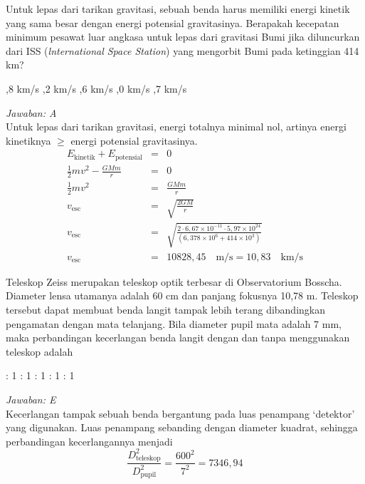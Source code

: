 \documentclass[11pt,fleqn, a4paper]{exam}
\begin{document}
\begin{questions}
\vspace{0.5cm}
\question Untuk lepas dari tarikan gravitasi, sebuah benda harus memiliki energi kinetik yang sama besar dengan energi potensial gravitasinya. Berapakah kecepatan minimum pesawat luar angkasa untuk lepas dari gravitasi Bumi jika diluncurkan dari ISS (\textit{lnternational Space Station}) yang mengorbit Bumi pada ketinggian 414 km?
\begin{choices}
,8 km/s
,2 km/s
,6 km/s
,0 km/s
,7 km/s
\end{choices}

\textit{Jawaban: A}\\
Untuk lepas dari tarikan gravitasi, energi totalnya minimal nol, artinya energi kinetiknya $\geq$ energi potensial gravitasinya.
\begin{eqnarray*}
E_{\text{kinetik}} + E_{\text{potensial}} &=& 0\\
\frac{1}{2} m v^2 - \frac{GMm}{r} &=& 0\\
\frac{1}{2} m v^2 &=& \frac{GMm}{r}\\
v_{\text{esc}} &=& \sqrt{\frac{2GM}{r}}\\
v_{\text{esc}} &=& \sqrt{\frac{2 \cdot 6,67 \times 10^{-11} \cdot 5,97 \times 10^{24}}{(6,378 \times 10^{6} + 414 \times 10^3)}}\\
v_{\text{esc}} &=& 10828,45 \quad \text{m/s} = 10,83 \quad \text{km/s}
\end{eqnarray*}


\vspace{0.5cm}
\question Teleskop Zeiss merupakan teleskop optik terbesar di Observatorium Bosscha. Diameter lensa utamanya adalah 60 cm dan panjang fokusnya 10,78 m. Teleskop tersebut dapat membuat benda langit tampak lebih terang dibandingkan pengamatan dengan mata telanjang. Bila diameter pupil mata adalah 7 mm, maka perbandingan kecerlangan benda langit dengan dan tanpa menggunakan teleskop adalah
\begin{choices}
 : 1
 : 1
 : 1
 : 1
 : 1
\end{choices}

\textit{Jawaban: E}\\
Kecerlangan tampak sebuah benda bergantung pada luas penampang `detektor' yang digunakan. Luas penampang sebanding dengan diameter kuadrat, sehingga perbandingan kecerlangannya menjadi
\begin{equation*}
\frac{D_{\text{teleskop}}^2}{D_{\text{pupil}}^2} = \frac{600^2}{7^2} = 7346,94
\end{equation*}



\end{questions}
\end{document}
